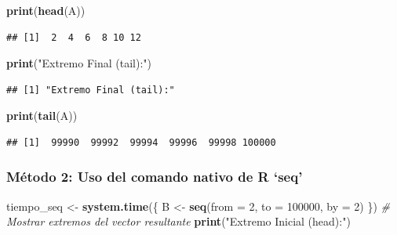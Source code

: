 \documentclass[]{llncs}
\newenvironment{Shaded}{\begin{snugshade}}{\end{snugshade}}
\newcommand{\AttributeTok}[1]{\textcolor[rgb]{0.13,0.29,0.53}{#1}}
\newcommand{\CommentTok}[1]{\textcolor[rgb]{0.56,0.35,0.01}{\textit{#1}}}
\newcommand{\DecValTok}[1]{\textcolor[rgb]{0.00,0.00,0.81}{#1}}
\newcommand{\FunctionTok}[1]{\textcolor[rgb]{0.13,0.29,0.53}{\textbf{#1}}}
\newcommand{\NormalTok}[1]{#1}
\newcommand{\OtherTok}[1]{\textcolor[rgb]{0.56,0.35,0.01}{#1}}
\newcommand{\StringTok}[1]{\textcolor[rgb]{0.31,0.60,0.02}{#1}}
\begin{document}
\begin{Shaded}
\begin{Highlighting}[]
\FunctionTok{print}\NormalTok{(}\FunctionTok{head}\NormalTok{(A))}
\end{Highlighting}
\end{Shaded}

\begin{verbatim}
## [1]  2  4  6  8 10 12
\end{verbatim}

\begin{Shaded}
\begin{Highlighting}[]
\FunctionTok{print}\NormalTok{(}\StringTok{"Extremo Final (tail):"}\NormalTok{)}
\end{Highlighting}
\end{Shaded}

\begin{verbatim}
## [1] "Extremo Final (tail):"
\end{verbatim}

\begin{Shaded}
\begin{Highlighting}[]
\FunctionTok{print}\NormalTok{(}\FunctionTok{tail}\NormalTok{(A))}
\end{Highlighting}
\end{Shaded}

\begin{verbatim}
## [1]  99990  99992  99994  99996  99998 100000
\end{verbatim}

\subsubsection{Método 2: Uso del comando nativo de R
`seq'}\label{muxe9todo-2-uso-del-comando-nativo-de-r-seq}

\begin{Shaded}
\begin{Highlighting}[]
\NormalTok{tiempo\_seq }\OtherTok{\textless{}{-}} \FunctionTok{system.time}\NormalTok{(\{}
\NormalTok{  B }\OtherTok{\textless{}{-}} \FunctionTok{seq}\NormalTok{(}\AttributeTok{from =} \DecValTok{2}\NormalTok{, }\AttributeTok{to =} \DecValTok{100000}\NormalTok{, }\AttributeTok{by =} \DecValTok{2}\NormalTok{)}
\NormalTok{\})}
\CommentTok{\# Mostrar extremos del vector resultante}
\FunctionTok{print}\NormalTok{(}\StringTok{"Extremo Inicial (head):"}\NormalTok{)}
\end{Highlighting}
\end{Shaded}
\end{document}
